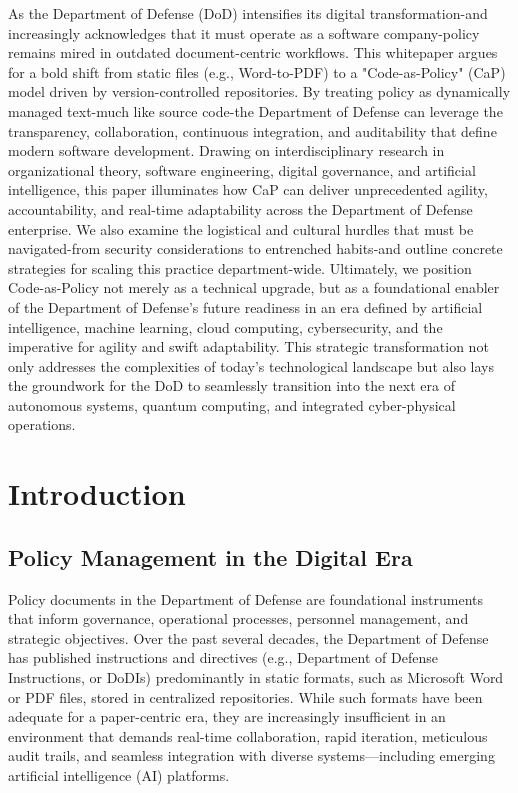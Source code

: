 \documentclass[11pt]{article}
\begin{document}
\makepapercover

{\small\renewcommand{\baselinestretch}{0.96}\selectfont\tableofcontents}
\newpage

\begin{execsummary}
As the Department of Defense (DoD) intensifies its digital transformation-and increasingly acknowledges that it must operate as a software company-policy remains mired in outdated document-centric workflows. This whitepaper argues for a bold shift from static files (e.g., Word-to-PDF) to a "Code-as-Policy" (CaP) model driven by version-controlled repositories. By treating policy as dynamically managed text-much like source code-the Department of Defense can leverage the transparency, collaboration, continuous integration, and auditability that define modern software development. Drawing on interdisciplinary research in organizational theory, software engineering, digital governance, and artificial intelligence, this paper illuminates how CaP can deliver unprecedented agility, accountability, and real-time adaptability across the Department of Defense enterprise. We also examine the logistical and cultural hurdles that must be navigated-from security considerations to entrenched habits-and outline concrete strategies for scaling this practice department-wide. Ultimately, we position Code-as-Policy not merely as a technical upgrade, but as a foundational enabler of the Department of Defense's future readiness in an era defined by artificial intelligence, machine learning, cloud computing, cybersecurity, and the imperative for agility and swift adaptability. This strategic transformation not only addresses the complexities of today's technological landscape but also lays the groundwork for the DoD to seamlessly transition into the next era of autonomous systems, quantum computing, and integrated cyber-physical operations.
\end{execsummary}

\section{Introduction}

\subsection{Policy Management in the Digital Era}
	Policy documents in the Department of Defense are foundational instruments that inform governance, operational processes, personnel management, and strategic objectives. Over the past several decades, the Department of Defense has published instructions and directives (e.g., Department of Defense Instructions, or DoDIs) predominantly in static formats, such as Microsoft Word or PDF files, stored in centralized repositories. While such formats have been adequate for a paper-centric era, they are increasingly insufficient in an environment that demands real-time collaboration, rapid iteration, meticulous audit trails, and seamless integration with diverse systems---including emerging artificial intelligence (AI) platforms.
\end{document}
